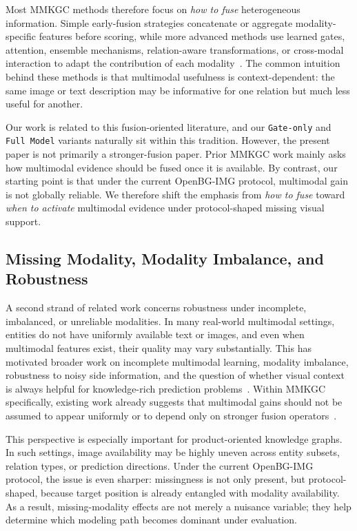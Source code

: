 \documentclass[11pt]{article}
\begin{document}
Most MMKGC methods therefore focus on \emph{how to fuse} heterogeneous information. Simple early-fusion strategies concatenate or aggregate modality-specific features before scoring, while more advanced methods use learned gates, attention, ensemble mechanisms, relation-aware transformations, or cross-modal interaction to adapt the contribution of each modality~\cite{ngiam2011multimodal,atrey2010multimodalfusion,arevalo2017gmu,zhao2022mose,liang2023hrgat,shang2024lafa,chen2022hybrid,jian2025amit,zhu2025modalities,gao2025mixed}. The common intuition behind these methods is that multimodal usefulness is context-dependent: the same image or text description may be informative for one relation but much less useful for another.

Our work is related to this fusion-oriented literature, and our \texttt{Gate-only} and \texttt{Full Model} variants naturally sit within this tradition. However, the present paper is not primarily a stronger-fusion paper. Prior MMKGC work mainly asks how multimodal evidence should be fused once it is available. By contrast, our starting point is that under the current OpenBG-IMG protocol, multimodal gain is not globally reliable. We therefore shift the emphasis from \emph{how to fuse} toward \emph{when to activate} multimodal evidence under protocol-shaped missing visual support.

\subsection{Missing Modality, Modality Imbalance, and Robustness}
A second strand of related work concerns robustness under incomplete, imbalanced, or unreliable modalities. In many real-world multimodal settings, entities do not have uniformly available text or images, and even when multimodal features exist, their quality may vary substantially. This has motivated broader work on incomplete multimodal learning, modality imbalance, robustness to noisy side information, and the question of whether visual context is always helpful for knowledge-rich prediction problems~\cite{atrey2010multimodalfusion,ramachandram2017deep,baltrusaitis2019multimodal,wang2021rsme}. Within MMKGC specifically, existing work already suggests that multimodal gains should not be assumed to appear uniformly or to depend only on stronger fusion operators~\cite{wang2021rsme,xu2022relation}.

This perspective is especially important for product-oriented knowledge graphs. In such settings, image availability may be highly uneven across entity subsets, relation types, or prediction directions. Under the current OpenBG-IMG protocol, the issue is even sharper: missingness is not only present, but protocol-shaped, because target position is already entangled with modality availability. As a result, missing-modality effects are not merely a nuisance variable; they help determine which modeling path becomes dominant under evaluation.
\end{document}
